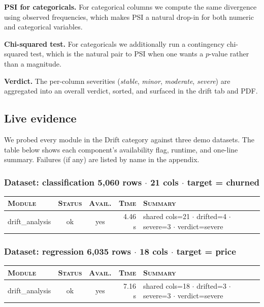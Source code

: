 \documentclass[11pt,a4paper]{article}
\begin{document}
\textbf{PSI for categoricals.} For categorical columns we compute the same divergence using observed frequencies, which makes PSI a natural drop-in for both numeric and categorical variables.

\textbf{Chi-squared test.} For categoricals we additionally run a contingency chi-squared test, which is the natural pair to PSI when one wants a $p$-value rather than a magnitude.

\textbf{Verdict.} The per-column severities (\textit{stable}, \textit{minor}, \textit{moderate}, \textit{severe}) are aggregated into an overall verdict, sorted, and surfaced in the drift tab and PDF.

\subsection{Live evidence}

We probed every module in the Drift category against three
demo datasets. The table below shows each component's availability flag,
runtime, and one-line summary. Failures (if any) are listed by name in the
appendix.


\subsubsection*{Dataset: classification
\hfill {\color{ink3}\footnotesize 5,060 rows
{$\boldsymbol{\cdot}$} 21 cols
{$\boldsymbol{\cdot}$} target = churned}}

\begin{tabularx}{\linewidth}{l c c r X}
\toprule
\textsc{Module} & \textsc{Status} & \textsc{Avail.} & \textsc{Time} & \textsc{Summary} \\
\midrule
drift\_analysis & \textcolor{ok}{ok} & \textcolor{ok}{yes} & 4.46 s & shared cols=21 $\cdot$ drifted=4 $\cdot$ severe=3 $\cdot$ verdict=severe \\
\bottomrule
\end{tabularx}


\subsubsection*{Dataset: regression
\hfill {\color{ink3}\footnotesize 6,035 rows
{$\boldsymbol{\cdot}$} 18 cols
{$\boldsymbol{\cdot}$} target = price}}

\begin{tabularx}{\linewidth}{l c c r X}
\toprule
\textsc{Module} & \textsc{Status} & \textsc{Avail.} & \textsc{Time} & \textsc{Summary} \\
\midrule
drift\_analysis & \textcolor{ok}{ok} & \textcolor{ok}{yes} & 7.16 s & shared cols=18 $\cdot$ drifted=3 $\cdot$ severe=3 $\cdot$ verdict=severe \\
\bottomrule
\end{tabularx}
\end{document}
